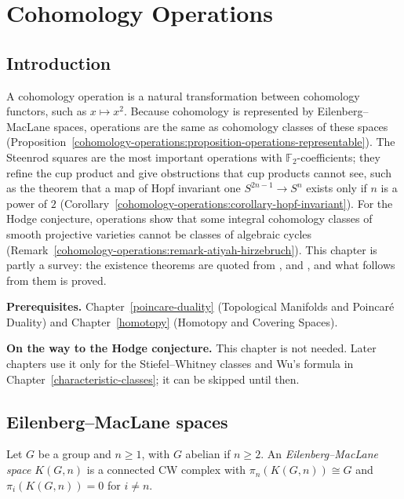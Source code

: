 \chapter{Cohomology Operations}\label{cohomology-operations}

\section{Introduction}\label{cohomology-operations:section-introduction}

A cohomology operation is a natural transformation between cohomology functors, such as $x \mapsto x^2$. Because cohomology is
represented by Eilenberg--MacLane spaces, operations are the same as cohomology classes of these spaces
(Proposition~\ref{cohomology-operations:proposition-operations-representable}). The Steenrod squares are the most important
operations with $\mathbb{F}_2$-coefficients; they refine the cup product and give obstructions that cup products cannot see, such as
the theorem that a map of Hopf invariant one $S^{2n-1} \to S^n$ exists only if $n$ is a power of $2$
(Corollary~\ref{cohomology-operations:corollary-hopf-invariant}). For the Hodge conjecture, operations show that some integral
cohomology classes of smooth projective varieties cannot be classes of algebraic cycles
(Remark~\ref{cohomology-operations:remark-atiyah-hirzebruch}). This chapter is partly a survey: the existence theorems are quoted
from \cite{hatcher-at}, \cite{steenrod-epstein} and \cite{mosher-tangora}, and what follows from them is proved.

\noindent\textbf{Prerequisites.} Chapter~\ref{poincare-duality} (Topological Manifolds and Poincar\'e Duality) and Chapter~\ref{homotopy}
(Homotopy and Covering Spaces).

\noindent\textbf{On the way to the Hodge conjecture.} This chapter is not needed. Later chapters use it only for the Stiefel--Whitney classes and Wu's formula in
Chapter~\ref{characteristic-classes}; it can be skipped until then.

\section{Eilenberg--MacLane spaces}\label{cohomology-operations:section-eilenberg-maclane}

\begin{definition}\label{cohomology-operations:definition-eilenberg-maclane}
Let $G$ be a group and $n \geq 1$, with $G$ abelian if $n \geq 2$. An \emph{Eilenberg--MacLane space} $K(G, n)$ is a connected CW complex with $\pi_n(K(G, n)) \cong G$ and
$\pi_i(K(G, n)) = 0$ for $i \neq n$.
\end{definition}

